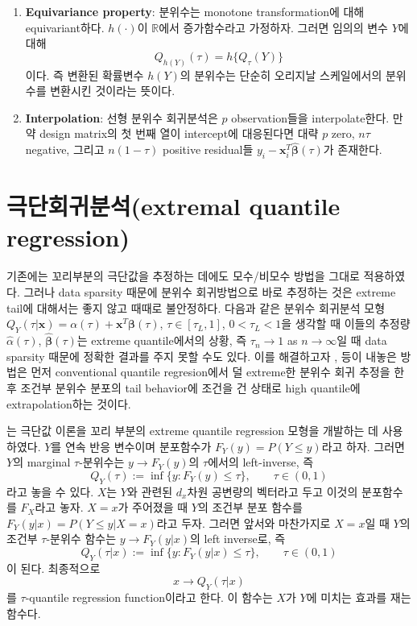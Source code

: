 \documentclass[b5paper,]{scrbook}
\theoremstyle{plain}
\theoremstyle{definition}
\numberwithin{equation}{section}
\begin{document}
\begin{enumerate}
\def\labelenumi{\arabic{enumi}.}
\setcounter{enumi}{1}
\item
  \textbf{Equivariance property}: 분위수는 monotone transformation에 대해 equivariant하다. \(h(\cdot)\)이 \(\mathbb{R}\)에서 증가함수라고 가정하자. 그러면 임의의 변수 \(Y\)에 대해
  \[Q_{h(Y)}(\tau)=h\{ Q_{\tau}(Y) \}\]
  이다. 즉 변환된 확률변수 \(h(Y)\)의 분위수는 단순히 오리지날 스케일에서의 분위수를 변환시킨 것이라는 뜻이다.
\item
  \textbf{Interpolation}: 선형 분위수 회귀분석은 \(p\) observation들을 interpolate한다. 만약 design matrix의 첫 번째 열이 intercept에 대응된다면 대략 \(p\) zero, \(n\tau\) negative, 그리고 \(n(1-\tau)\) positive residual들 \(y_{i}-\mathbf{x}_{i}^{T}\hat{\boldsymbol{\beta}}(\tau)\)가 존재한다.
\end{enumerate}

\hypertarget{extremal-quantile-regression}{%
\section{극단회귀분석(extremal quantile regression)}\label{extremal-quantile-regression}}

기존에는 꼬리부분의 극단값을 추정하는 데에도 모수/비모수 방법을 그대로 적용하였다. 그러나 data sparsity 때문에 분위수 회귀방법으로 바로 추정하는 것은 extreme tail에 대해서는 좋지 않고 때때로 불안정하다. 다음과 같은 분위수 회귀분석 모형 \(Q_{Y}(\tau|\mathbf{x})=\alpha(\tau) + \mathbf{x}^{T}\boldsymbol{\beta}(\tau)\), \(\tau\in [\tau_{L},1]\), \(0<\tau_{L}< 1\)을 생각할 때 이들의 추정량 \(\hat{\alpha}(\tau)\), \(\hat{\boldsymbol{\beta}}(\tau)\)는 extreme quantile에서의 상황, 즉 \(\tau_{n}\rightarrow 1\) as \(n\rightarrow\infty\)일 때 data sparsity 때문에 정확한 결과를 주지 못할 수도 있다. 이를 해결하고자 \citep{Wang2012}, \citep{Wang2013} 등이 내놓은 방법은 먼저 conventional quantile regresion에서 덜 extreme한 분위수 회귀 추정을 한 후 조건부 분위수 분포의 tail behavior에 조건을 건 상태로 high quantile에 extrapolation하는 것이다.

\citep{Chernozhukov2005}는 극단값 이론을 꼬리 부분의 extreme quantile regression 모형을 개발하는 데 사용하였다. \(Y\)를 연속 반응 변수이며 분포함수가 \(F_{Y}(y)=P(Y\leq y)\)라고 하자. 그러면 \(Y\)의 marginal \(\tau\)-분위수는 \(y\rightarrow F_{Y}(y)\)의 \(\tau\)에서의 left-inverse, 즉
\[Q_{Y}(\tau):=\inf \{ y:F_{Y}(y)\leq \tau\}, \qquad{\tau\in(0,1)}\]
라고 놓을 수 있다. \(X\)는 \(Y\)와 관련된 \(d_{x}\)차원 공변량의 벡터라고 두고 이것의 분포함수를 \(F_{X}\)라고 놓자. \(X=x\)가 주어졌을 때 \(Y\)의 조건부 분포 함수를 \(F_{Y}(y|x)=P(Y\leq y|X=x)\)라고 두자. 그러면 앞서와 마찬가지로 \(X=x\)일 때 \(Y\)의 조건부 \(\tau\)-분위수 함수는 \(y\rightarrow F_{Y}(y|x)\)의 left inverse로, 즉
\[Q_{Y}(\tau|x):=\inf \{ y:F_{Y}(y|x)\leq \tau\}, \qquad{\tau\in(0,1)}\]
이 된다. 최종적으로
\[x\rightarrow Q_{Y}(\tau|x)\]
를 \(\tau\)-quantile regression function이라고 한다. 이 함수는 \(X\)가 \(Y\)에 미치는 효과를 재는 함수다.
\end{document}
